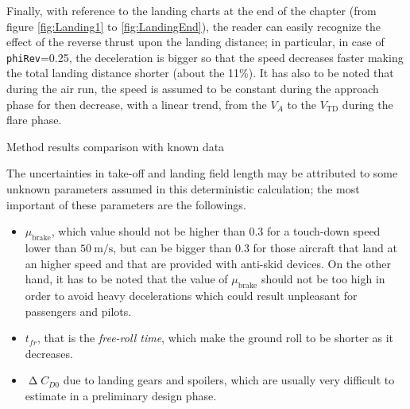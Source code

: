 \bigskip
\noindent
Finally, with reference to the landing charts at the end of the chapter (from figure \ref{fig:Landing1} to \ref{fig:LandingEnd}), the reader can easily recognize the effect of the reverse thrust upon the landing distance; in particular, in case of \lstinline[language=Java]!phiRev!=0.25, the deceleration is bigger so that the speed decreases faster making the total landing distance shorter (about the 11\%). It has also to be noted that during the air run, the speed is assumed to be constant during the approach phase for then decrease, with a linear trend, from the $V_A$ to the $V_{\text{TD}}$ during the flare phase. 
%
\begin{table}[H]
\caption{Method results comparison with known data}
\end{table}
%
\noindent
The uncertainties in take-off and landing field length may be attributed to some unknown parameters assumed in this deterministic calculation; the most important of these parameters are the followings.
%
\begin{itemize}
	\item $\mu_{\text{brake}}$, which value should not be higher than 0.3 for a touch-down speed lower than $\SI{50}{\meter\per\second}$, but can be bigger than 0.3 for those aircraft that land at an higher speed and that are provided with anti-skid devices. On the other hand, it has to be noted that the value of $\mu_{\text{brake}}$ should not be too high in order to avoid heavy decelerations which could result unpleasant for passengers and pilots.
	\item $t_{fr}$, that is the \emph{free-roll time}, which make the ground roll to be shorter as it decreases.
	\item $\upDelta C_{D0}$ due to landing gears and spoilers, which are usually very difficult to estimate in a preliminary design phase.
\end{itemize}
